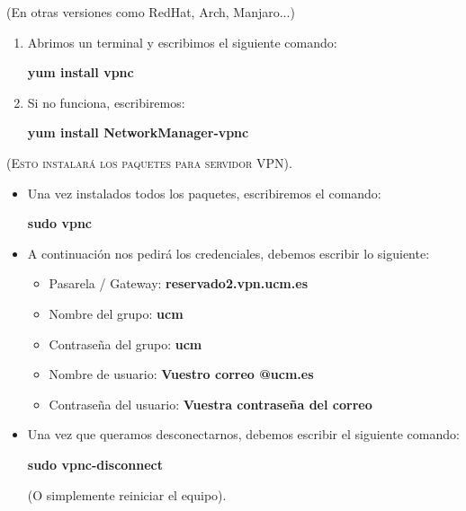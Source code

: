 \begin{tcolorbox}[colframe=black!75!red]
\begin{center}
    (En otras versiones como RedHat, Arch, Manjaro...)
\end{center}
\end{tcolorbox}
\begin{enumerate}
    \item Abrimos un terminal y escribimos el siguiente comando: 
        \begin{center}
         \textbf{yum  install vpnc} 
        \end{center}
        \item Si no funciona, escribiremos: 
        \begin{center}
         \textbf{yum install NetworkManager‐vpnc}
        \end{center}
\end{enumerate}

\newline \textsc{(Esto instalará los paquetes para servidor VPN)}.

\begin{itemize}
    \item Una vez instalados todos los paquetes, escribiremos el comando:
    \begin{center}
         \textbf{sudo vpnc} 
    \end{center}
    
    \item A continuación nos pedirá los credenciales, debemos escribir lo siguiente:
    \begin{tcolorbox}
        \begin{center}
            \begin{itemize}
               \item Pasarela / Gateway: \textbf{reservado2.vpn.ucm.es} 
               \item Nombre del grupo: \textbf{ucm}
               \item Contraseña del grupo: \textbf{ucm}
               \item Nombre de usuario: \textbf{Vuestro correo @ucm.es}
               \item Contraseña del usuario: \textbf{Vuestra contraseña del correo}
             \end{itemize}
        \end{center}
    \end{tcolorbox}
    
    \item Una vez que queramos desconectarnos, debemos escribir el siguiente comando:
        \begin{center}
            \textbf{sudo vpnc-disconnect}
        \end{center}
        \newline (O simplemente reiniciar el equipo).
\end{itemize}

